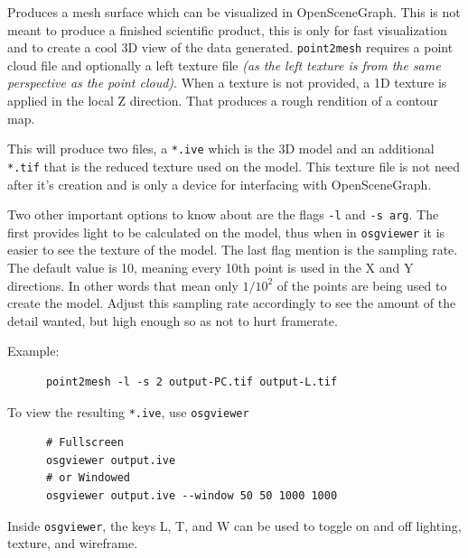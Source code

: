 Produces a mesh surface which can be visualized in
OpenSceneGraph. This is not meant to produce a finished scientific
product, this is only for fast visualization and to create a cool 3D
view of the data generated. \verb#point2mesh# requires a point cloud
file and optionally a left texture file \emph{(as the left texture is
  from the same perspective as the point cloud)}. When a texture is
not provided, a 1D texture is applied in the local Z direction. That
produces a rough rendition of a contour map.

This will produce two files, a \verb#*.ive# which is the 3D model and
an additional \verb#*.tif# that is the reduced texture used on the
model. This texture file is not need after it's creation and is only a
device for interfacing with OpenSceneGraph.

Two other important options to know about are the flags \verb#-l# and
\verb#-s arg#. The first provides light to be calculated on the model,
thus when in \verb#osgviewer# it is easier to see the texture of the
model. The last flag mention is the sampling rate. The default value
is 10, meaning every 10th point is used in the X and Y directions. In
other words that mean only $1/10^2$ of the points are being used to
create the model. Adjust this sampling rate accordingly to see the
amount of the detail wanted, but high enough so as not to hurt
framerate.

Example:
\begin{verbatim}
      point2mesh -l -s 2 output-PC.tif output-L.tif
\end{verbatim}

To view the resulting \verb#*.ive#, use \verb#osgviewer#

\begin{verbatim}
      # Fullscreen
      osgviewer output.ive
      # or Windowed
      osgviewer output.ive --window 50 50 1000 1000
\end{verbatim}

Inside \verb#osgviewer#, the keys L, T, and W can be used to toggle on
and off lighting, texture, and wireframe.

